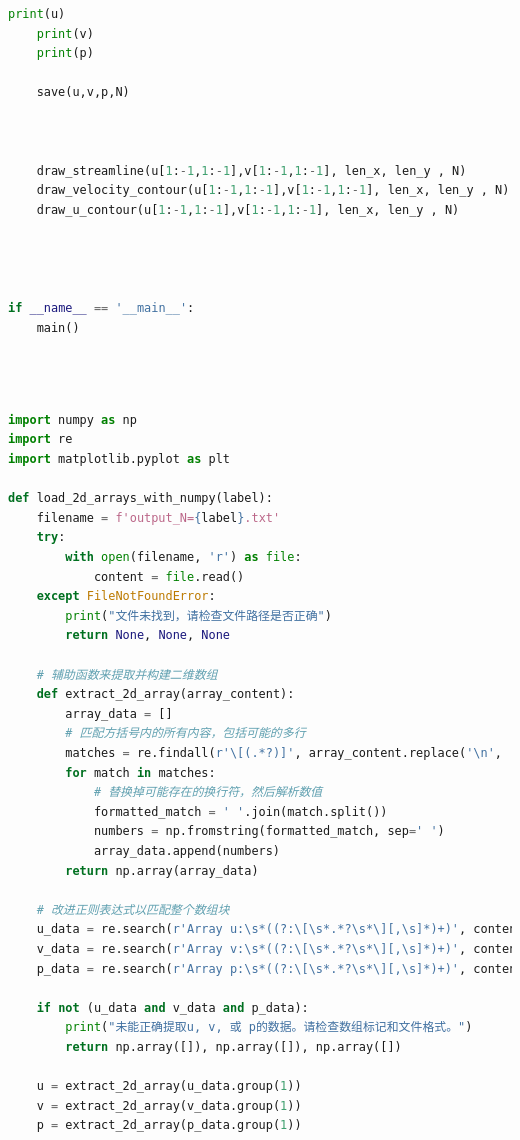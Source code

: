 \documentclass[12pt]{article}
\begin{document}
\begin{scriptsize}
\begin{lstlisting}[language=python,caption={Lid Driven Cavity Solver}]
    print(u)
    print(v)
    print(p)

    save(u,v,p,N)
    

    
    draw_streamline(u[1:-1,1:-1],v[1:-1,1:-1], len_x, len_y , N)
    draw_velocity_contour(u[1:-1,1:-1],v[1:-1,1:-1], len_x, len_y , N)
    draw_u_contour(u[1:-1,1:-1],v[1:-1,1:-1], len_x, len_y , N)




if __name__ == '__main__':
    main()





\end{lstlisting}





\begin{lstlisting}[language=python,caption={Post Operator:}]
import numpy as np
import re
import matplotlib.pyplot as plt

def load_2d_arrays_with_numpy(label):
    filename = f'output_N={label}.txt'
    try:
        with open(filename, 'r') as file:
            content = file.read()
    except FileNotFoundError:
        print("文件未找到，请检查文件路径是否正确")
        return None, None, None

    # 辅助函数来提取并构建二维数组
    def extract_2d_array(array_content):
        array_data = []
        # 匹配方括号内的所有内容，包括可能的多行
        matches = re.findall(r'\[(.*?)]', array_content.replace('\n', ''), re.DOTALL)
        for match in matches:
            # 替换掉可能存在的换行符，然后解析数值
            formatted_match = ' '.join(match.split())
            numbers = np.fromstring(formatted_match, sep=' ')
            array_data.append(numbers)
        return np.array(array_data)

    # 改进正则表达式以匹配整个数组块
    u_data = re.search(r'Array u:\s*((?:\[\s*.*?\s*\][,\s]*)+)', content, re.DOTALL)
    v_data = re.search(r'Array v:\s*((?:\[\s*.*?\s*\][,\s]*)+)', content, re.DOTALL)
    p_data = re.search(r'Array p:\s*((?:\[\s*.*?\s*\][,\s]*)+)', content, re.DOTALL)

    if not (u_data and v_data and p_data):
        print("未能正确提取u, v, 或 p的数据。请检查数组标记和文件格式。")
        return np.array([]), np.array([]), np.array([])

    u = extract_2d_array(u_data.group(1))
    v = extract_2d_array(v_data.group(1))
    p = extract_2d_array(p_data.group(1))


\end{lstlisting}
\end{scriptsize}
\end{document}
